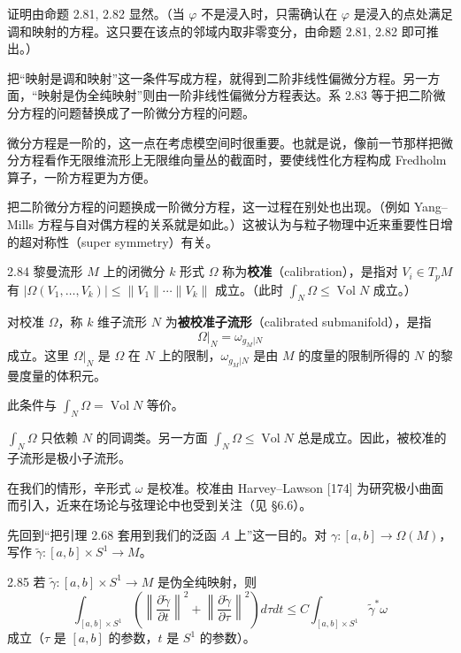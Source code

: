 证明由命题 2.81, 2.82 显然。（当 $\varphi$ 不是浸入时，只需确认在 $\varphi$ 是浸入的点处满足调和映射的方程。这只要在该点的邻域内取非零变分，由命题 2.81, 2.82 即可推出。）

把“映射是调和映射”这一条件写成方程，就得到二阶非线性偏微分方程。另一方面，“映射是伪全纯映射”则由一阶非线性偏微分方程表达。系 2.83 等于把二阶微分方程的问题替换成了一阶微分方程的问题。

微分方程是一阶的，这一点在考虑模空间时很重要。也就是说，像前一节那样把微分方程看作无限维流形上无限维向量丛的截面时，要使线性化方程构成 Fredholm 算子，一阶方程更为方便。

把二阶微分方程的问题换成一阶微分方程，这一过程在别处也出现。（例如 Yang–Mills 方程与自对偶方程的关系就是如此。）这被认为与粒子物理中近来重要性日增的超对称性（super symmetry）有关。

\begin{remark}{2.84}
  黎曼流形 $M$ 上的闭微分 $k$ 形式 $\Omega$ 称为\textbf{校准}（calibration），是指对 $V_i\in T_pM$ 有 $|\Omega(V_1,\dots,V_k)|\le\|V_1\|\cdots\|V_k\|$ 成立。（此时 $\int_N\Omega\le\operatorname{Vol}N$ 成立。）

  对校准 $\Omega$，称 $k$ 维子流形 $N$ 为\textbf{被校准子流形}（calibrated submanifold），是指
  \[
    \Omega|_N=\omega_{g_M|N}
  \]
  成立。这里 $\Omega|_N$ 是 $\Omega$ 在 $N$ 上的限制，$\omega_{g_M|N}$ 是由 $M$ 的度量的限制所得的 $N$ 的黎曼度量的体积元。

  此条件与 $\int_N\Omega=\operatorname{Vol}N$ 等价。

  $\int_N\Omega$ 只依赖 $N$ 的同调类。另一方面 $\int_N\Omega\le\operatorname{Vol}N$ 总是成立。因此，被校准的子流形是极小子流形。

  在我们的情形，辛形式 $\omega$ 是校准。校准由 Harvey–Lawson [174] 为研究极小曲面而引入，近来在场论与弦理论中也受到关注（见 §6.6）。
\end{remark}

先回到“把引理 2.68 套用到我们的泛函 $A$ 上”这一目的。对 $\gamma\colon[a,b]\to\Omega(M)$，写作 $\tilde\gamma\colon[a,b]\times S^1\to M$。

\begin{lemma*}{2.85}
  若 $\tilde\gamma\colon[a,b]\times S^1\to M$ 是伪全纯映射，则
  \[
    \int_{[a,b]\times S^1}\left(\left\|\frac{\partial\tilde\gamma}{\partial t}\right\|^2
    +\left\|\frac{\partial\tilde\gamma}{\partial\tau}\right\|^2\right)d\tau dt
    \le C\int_{[a,b]\times S^1}\tilde\gamma^*\omega
  \]
  成立（$\tau$ 是 $[a,b]$ 的参数，$t$ 是 $S^1$ 的参数）。
\end{lemma*}

